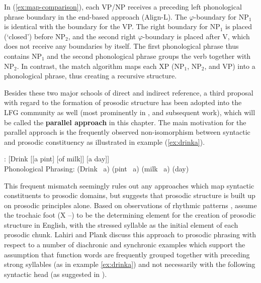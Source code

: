 \documentclass[output=paper,hidelinks]{langscibook}
\begin{document}
\noindent In (\ref{ex:map-comparison}), each VP/NP receives a preceding left phonological phrase boundary in the end-based approach ({\sc Align-L}). The $\varphi$-boundary for NP$_1$ is identical with the boundary for the VP. The right boundary for NP$_1$ is placed (`closed') before NP$_2$, and the second right $\varphi$-boundary is placed after V, which does not receive any boundaries by itself. The first phonological phrase thus contains NP$_1$ and the second phonological phrase groups the verb together  with NP$_2$. In contrast, the {\sc match} algorithm maps each XP (NP$_1$,  NP$_2$, and VP)   into a phonological phrase, thus creating a recursive structure. 


Besides these two major schools of direct and indirect reference, a third proposal with regard to the formation of prosodic structure has been adopted into the LFG community as well (most prominently in \citealt{DM11, MycockLowe2013}, and subsequent work), which will be called the {\bf parallel approach} in this chapter. The main motivation for the parallel approach is the frequently observed non-isomorphism between syntactic and prosodic constituency as illustrated in example (\ref{ex:drinka}).

\ea\label{ex:drinka}
: \hspace{2ex}[Drink [[a pint] [of milk]] [a day]]\\
{Phonological Phrasing}:  \hspace{2ex}(Drink \ a) (pint \ a) (milk \ a) (day) \\
\glt \indent\hfill\citep[376, modified]{LahiriPlank2010}
\z

\noindent This frequent mismatch seemingly rules out any approaches which map syntactic constituents to prosodic domains, but suggests that prosodic structure is built up on prosodic  principles alone. Based on observations of rhythmic patterns \citep[e.g.,][]{Sweet1904},  \citet{LahiriPlank2010} assume the trochaic foot (X --) to be the determining element for the creation of prosodic structure in English, with the stressed syllable as the initial element of each prosodic chunk.
Lahiri and Plank discuss this approach to prosodic phrasing with respect to a number of diachronic and synchronic examples which support the assumption that function words are frequently grouped together with preceding strong syllables (as in example \ref{ex:drinka}) and not necessarily with the following  syntactic head (as suggested in ).
\end{document}
